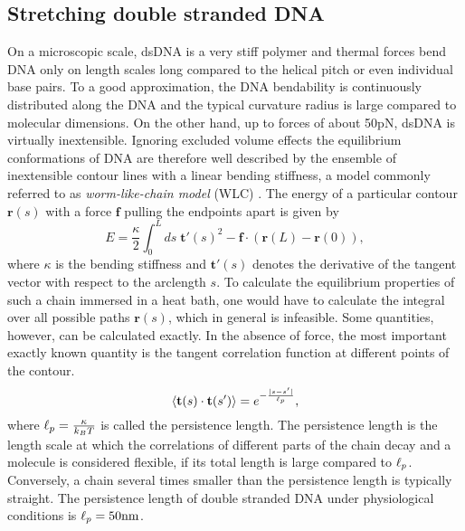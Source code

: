 \subsection{\label{sec:stretching_dsDNA}Stretching double stranded DNA}
%
On a microscopic scale, dsDNA is a very stiff polymer and thermal forces bend DNA
only on length scales long compared to the helical pitch  or even individual base pairs. 
To a good approximation, the DNA bendability is continuously distributed along the DNA
and the typical curvature radius is large compared to molecular dimensions. 
On the other hand, up to forces of about 50pN, dsDNA is virtually inextensible. 
Ignoring excluded volume effects the equilibrium conformations of DNA are therefore 
well described by the ensemble of inextensible
contour lines with a linear bending stiffness, a model commonly referred to as \emph{worm-like-chain
model} (WLC) \cite{Saito_JPSJap_66, Kratky_Porod_49}. The energy of a particular contour $\mathbf{r}(s)$ with a force $\mathbf{f}$ pulling
the endpoints apart is given by
\begin{equation}
\label{eq:WLC_energy}
E=\frac{\kappa}{2} \int_0^{L} ds\; \mathbf{t}'(s)^{2} -\mathbf{f}\cdot(\mathbf{r}(L)-\mathbf{r}(0)),
\end{equation}
where $\kappa$ is the bending stiffness and $\mathbf{t}'(s)$ denotes the derivative of the 
tangent vector with respect to the arclength $s$. To calculate the equilibrium properties of 
such a chain immersed in a heat bath, one would have to calculate the integral over all
possible paths $\mathbf{r}(s)$, which in general is infeasible. Some quantities, however, can 
be calculated exactly. In the absence of force, the 
most important exactly known quantity is the tangent correlation 
function at different points of the contour. 
\begin{equation}
\label{eq:WLC_tangentcorr}
\langle \mathbf{t}(s)\cdot\mathbf{t}(s')\rangle=e^{-\frac{|s-s'|}{{\ell_p}}},
\end{equation}
where ${\ell_p}=\frac{\kappa}{k_BT}$ is called the persistence length. 
The persistence length is the length scale at which the correlations of different parts of the chain
decay and a molecule is considered flexible, if its total length is large compared to ${\ell_p}$. 
Conversely, a chain several times smaller than the persistence length is typically straight.
The persistence length of double stranded DNA under physiological conditions is ${\ell_p}=50\mathrm{nm}$.

